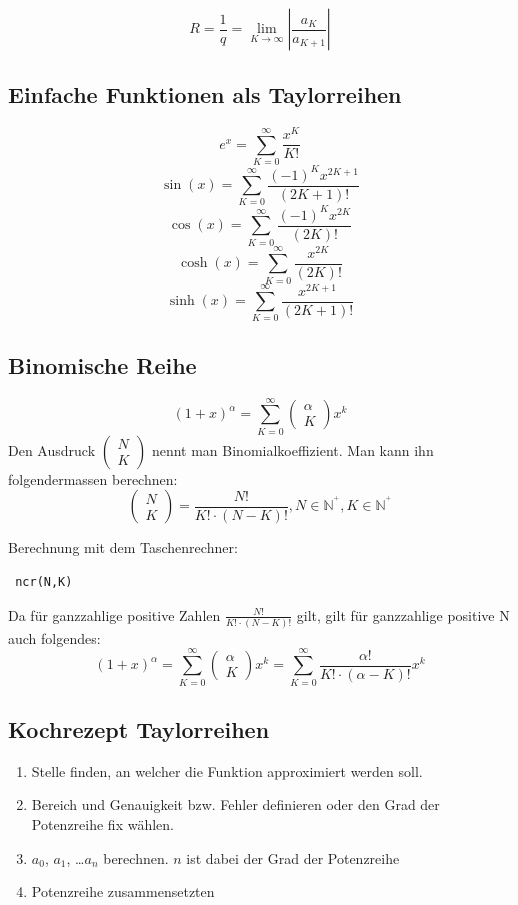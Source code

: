 \[ \boxed{R = \frac{1}{q} = \lim_{K \rightarrow \infty} \left| 
\frac{a_K}{a_{K + 1}} \right|} \]

\subsection{Einfache Funktionen als Taylorreihen}
\[ \boxed{e^x = \sum_{K=0}^{\infty} \frac{x^K}{K!}} \]
\[ \boxed{\sin(x) = \sum_{K=0}^{\infty} \frac{(-1)^K x^{2K+1}}{(2K+1)!}} \]
\[ \boxed{\cos(x) = \sum_{K=0}^{\infty} \frac{(-1)^K x^{2K}}{(2K)!}} \]
\[ \boxed{\cosh(x) = \sum_{K=0}^{\infty} \frac{x^{2K}}{(2K)!}} \]
\[ \boxed{\sinh(x) = \sum_{K=0}^{\infty} \frac{x^{2K+1}}{(2K+1)!}} \]

\subsection{Binomische Reihe}
\[ \boxed{(1 + x)^\alpha = \sum_{K=0}^{\infty}
\left(\begin{matrix}\alpha\\K\end{matrix}\right)x^k } \]
Den Ausdruck \( \left(\begin{matrix}N\\K\end{matrix}\right) \) nennt man 
Binomialkoeffizient. Man kann ihn folgendermassen berechnen:
\[ \boxed{\left(\begin{matrix}N\\K\end{matrix}\right) 
= \frac{N !}{K! \cdot (N - K)!}, N \in \mathbb{N}^{{}^{\ensuremath{\!+\!}}}_{}, 
K \in \mathbb{N}^{{}^{\ensuremath{\!+\!}}}_{} } \]

\iftiboth
\noindent
Berechnung mit dem Taschenrechner:
\begin{verbatim} ncr(N,K) \end{verbatim}
\fi

\noindent
Da für ganzzahlige positive Zahlen \( \frac{N !}{K! \cdot (N - K)!} \) gilt, 
gilt für ganzzahlige positive N auch folgendes:
\[ \boxed{(1 + x)^\alpha = \sum_{K=0}^{\infty}
\left(\begin{matrix}\alpha\\K\end{matrix}\right)x^k 
= \sum_{K=0}^{\infty}\frac{\alpha !}{K! \cdot (\alpha - K)!}x^k} \]

\subsection{Kochrezept Taylorreihen}
\begin{enumerate}
  \item Stelle finden, an welcher die Funktion approximiert werden soll. 
  \item Bereich und Genauigkeit bzw. Fehler definieren oder den Grad der 
  Potenzreihe fix wählen. 
  \item $a_0$, $a_1$, \dots $a_n$ berechnen. $n$ ist dabei der Grad der 
  Potenzreihe
  \item Potenzreihe zusammensetzten
\end{enumerate}

